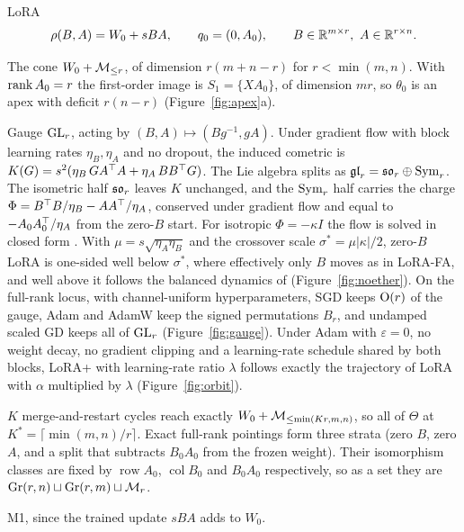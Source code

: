 \begin{example*}{LoRA}\label{ex:lora}%
\[
  \rho(B,A)=W_0+sBA,\qquad q_0=(0,A_0),\qquad B\in\mathbb{R}^{m\times r},\ A\in\mathbb{R}^{r\times n}.
\]
\begin{exVIIlines}
\item[Image] The cone $W_0+\mathcal{M}_{\le r}$, of dimension $r(m+n-r)$ for $r<\min(m,n)$. With $\operatorname{rank} A_0=r$ the first-order image is
  $S_1=\{XA_0\}$, of dimension $mr$, so $\theta_0$ is an apex with deficit $r(n-r)$ (Figure~\ref{fig:apex}a).
\item[Fibre] Gauge $\mathrm{GL}_r$, acting by $(B,A)\mapsto(Bg^{-1},gA)$. Under gradient flow with block learning rates
  $\eta_B,\eta_A$ and no dropout, the induced cometric is $K(G)=s^2(\eta_B\,GA^{\top} A+\eta_A\,BB^{\top} G)$. The Lie algebra splits as $\mathfrak{gl}_r=\mathfrak{so}_r\oplus\mathrm{Sym}_r$. The
  isometric half $\mathfrak{so}_r$ leaves $K$ unchanged, and the $\mathrm{Sym}_r$ half carries the charge
  $\Phi=B^{\top} B/\eta_B-AA^{\top}/\eta_A$, conserved under gradient flow and equal to $-A_0A_0^{\top}/\eta_A$ from the zero-$B$
  start. For isotropic $\Phi=-\kappa I$ the flow is solved in closed form
  \citep{xtarmoun2021understanding,xmin2021explicit}. With $\mu=s\sqrt{\eta_A\eta_B}$ and the crossover scale
  $\sigma^*=\mu\lvert\kappa\rvert/2$, zero-$B$ LoRA is one-sided well below $\sigma^*$, where effectively only $B$ moves
  as in LoRA-FA, and well above it follows the balanced dynamics of \citet{arora2018optimization}
  (Figure~\ref{fig:noether}). On the full-rank locus, with channel-uniform hyperparameters, SGD keeps $\mathrm{O}(r)$ of the
  gauge, Adam and AdamW keep the signed permutations $B_r$, and undamped scaled GD keeps all of $\mathrm{GL}_r$
  (Figure~\ref{fig:gauge}). Under Adam with $\varepsilon=0$, no weight decay, no gradient clipping and a learning-rate
  schedule shared by both blocks, LoRA+ with learning-rate ratio $\lambda$ follows exactly the trajectory of LoRA with
  $\alpha$ multiplied by $\lambda$ \citep{schulman2025lora} (Figure~\ref{fig:orbit}).
\item[Base] $K$ merge-and-restart cycles reach exactly $W_0+\mathcal{M}_{\le\min(Kr,m,n)}$, so all of $\Theta$ at
  $K^*=\lceil\min(m,n)/r\rceil$. Exact full-rank pointings form three strata (zero $B$, zero $A$, and a split that
  subtracts $B_0A_0$ from the frozen weight). Their isomorphism classes are fixed by $\operatorname{row}A_0$,
  $\operatorname{col}B_0$ and $B_0A_0$ respectively, so as a set they are $\operatorname{Gr}(r,n)\sqcup\operatorname{Gr}(r,m)\sqcup\mathcal{M}_r$.
\item[Merge] M1, since the trained update $sBA$ adds to $W_0$.
\end{exVIIlines}
\end{example*}

